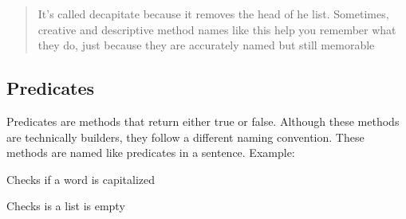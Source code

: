 \begin{Shaded}
\begin{Highlighting}[]
\NormalTok{):}
    \OperatorTok{=} \NormalTok{.\_\_list[}\NormalTok{::]}
\end{Highlighting}
\end{Shaded}

\begin{quote}
It's called decapitate because it removes the head of he list.
Sometimes, creative and descriptive method names like this help you
remember what they do, just because they are accurately named but still
memorable
\end{quote}

\subsection{Predicates}\label{extra-stuff.md__predicates}

\begin{Shaded}
\begin{Highlighting}[]
\NormalTok{) }\OperatorTok{{-}\textgreater{}} \NormalTok{:}
    \OperatorTok{\textgreater{}} 
\end{Highlighting}
\end{Shaded}

Predicates are methods that return either true or false. Although these
methods are technically builders, they follow a different naming
convention. These methods are named like predicates in a sentence.
Example:

Checks if a word is capitalized

\begin{Shaded}
\begin{Highlighting}[]
\NormalTok{) }\OperatorTok{{-}\textgreater{}} \NormalTok{:}
    \NormalTok{ word[}\NormalTok{].isUpper()}
\end{Highlighting}
\end{Shaded}

Checks is a list is empty

\begin{Shaded}
\begin{Highlighting}[]
\NormalTok{:[}\NormalTok{]) }\OperatorTok{{-}\textgreater{}} \NormalTok{:}
     \NormalTok{(}\NormalTok{) }\OperatorTok{==} 
\end{Highlighting}
\end{Shaded}

